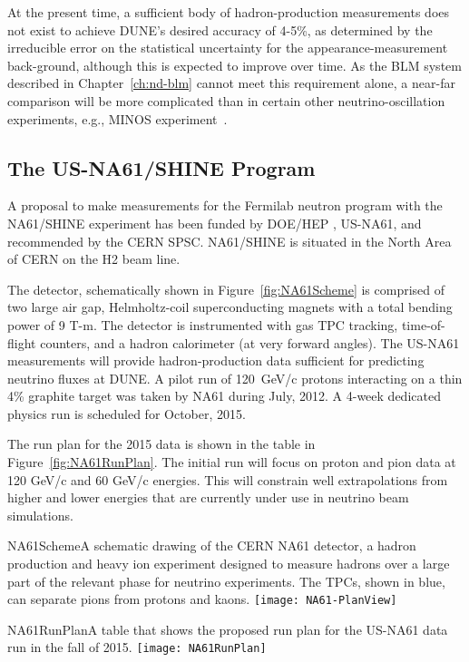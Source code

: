 At the present time, a sufficient body of hadron-production measurements does
not exist to achieve DUNE's desired accuracy of 4-5\%, as determined by the irreducible error on the statistical uncertainty for the appearance-measurement back-ground, although this is expected to improve over time. As the BLM system described in Chapter~\ref{ch:nd-blm} cannot meet this requirement alone, a near-far comparison
will be more complicated than in certain other neutrino-oscillation experiments, e.g.,
MINOS experiment~\cite{gnumi-validation}.


\subsection{The US-NA61/SHINE Program}
\label{sec:detectors-nd-blm-external-usna61}

A proposal to make measurements for the Fermilab neutron program with the NA61/SHINE experiment has been funded by DOE/HEP \cite{ref:NA61Proposal,ref:NA61Addendum} , US-NA61, and recommended by the CERN SPSC. NA61/SHINE is situated in the North Area of CERN on the H2 beam line. 

The detector, schematically shown in Figure~\ref{fig:NA61Scheme} is comprised of two large air gap, Helmholtz-coil superconducting magnets with a total bending power of 9 T-m. The detector is instrumented with gas TPC tracking, time-of-flight counters, and a hadron calorimeter (at very forward angles). The US-NA61 measurements will provide hadron-production data sufficient for predicting neutrino fluxes at DUNE. A pilot run of 120~GeV/c protons interacting on a thin 4\% graphite target was taken by NA61 during July, 2012. A 4-week dedicated physics run is scheduled for October, 2015.

The run plan for the 2015 data is shown in the table in Figure~\ref{fig:NA61RunPlan}. The initial run will focus on proton and pion data at 120 GeV/c and 60 GeV/c energies. This will constrain well extrapolations from higher and lower energies that are currently under use in neutrino beam simulations.

\begin{cdrfigure}{NA61Scheme}{A schematic drawing of the CERN NA61 detector, a hadron production and heavy ion experiment designed to measure hadrons over a large part of the relevant phase for neutrino experiments. The TPCs, shown in blue, can separate pions from protons and kaons.}
\texttt{[image: NA61-PlanView]}
\end{cdrfigure}

\begin{cdrfigure}{NA61RunPlan}{A table that shows the proposed run plan for 
the US-NA61 data run in the fall of 2015.}
\texttt{[image: NA61RunPlan]}
\end{cdrfigure}

